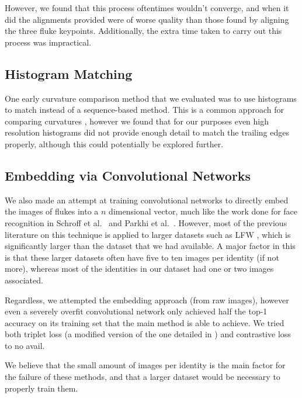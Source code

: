 However, we found that this process oftentimes wouldn't converge, and when it did the alignments provided were of worse quality than those found by aligning the three fluke keypoints.
Additionally, the extra time taken to carry out this process was impractical.

\subsection{Histogram Matching}

One early curvature comparison method that we evaluated was to use histograms to match instead of a sequence-based method.
This is a common approach for comparing curvatures \cite{kumar2012leafsnap}, however we found that for our purposes even high resolution histograms did not provide enough detail to match the trailing edges properly, although this could potentially be explored further.

\subsection{Embedding via Convolutional Networks}

We also made an attempt at training convolutional networks to directly embed the images of flukes into a $n$ dimensional vector, much like the work done for face recognition in Schroff et al.\ \cite{schroff2015facenet} and Parkhi et al.\ \cite{parkhi2015deep}.
However, most of the previous literature on this technique is applied to larger datasets such as LFW \cite{huang2007labeled}, which is significantly larger than the dataset that we had available.
A major factor in this is that these larger datasets often have five to ten images per identity (if not more), whereas most of the identities in our dataset had one or two images associated.

Regardless, we attempted the embedding approach (from raw images), however even a severely overfit convolutional network only achieved half the top-1 accuracy on its training set that the main method is able to achieve.
We tried both triplet loss (a modified version of the one detailed in \cite{schroff2015facenet}) and contrastive loss \cite{hadsell2006dimensionality} to no avail.

We believe that the small amount of images per identity is the main factor for the failure of these methods, and that a larger dataset would be necessary to properly train them.

